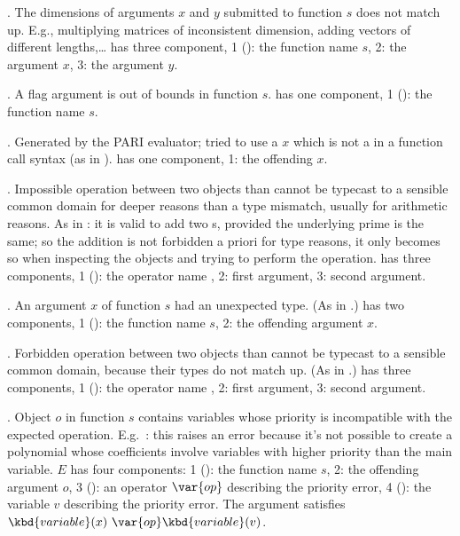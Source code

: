 
 \item {}. The dimensions of arguments $x$ and $y$ submitted
 to function $s$ does not match up.
 E.g., multiplying matrices of inconsistent dimension, adding vectors of
 different lengths,\dots
  has three component, 1 (): the function name $s$, 2: the
 argument $x$, 3: the argument $y$.

 \item {}. A flag argument is out of bounds in function $s$.
  has one component, 1 (): the function name $s$.

 \item {}. Generated by the PARI evaluator; tried to use a
 $x$ which is not a  in a function call syntax (as in
).
  has one component, 1: the offending  $x$.

 \item {}. Impossible operation between two objects than cannot
 be typecast to a sensible common domain for deeper reasons than a type
 mismatch, usually for arithmetic reasons. As in : it is
 valid to add two s, provided the underlying prime is the same; so
 the addition is not forbidden a priori for type reasons, it only becomes so
 when inspecting the objects and trying to perform the operation.
  has three components, 1 (): the operator name ,
 2: first argument, 3: second argument.

 \item {}. An argument $x$ of function $s$ had an unexpected type.
 (As in .)
  has two components, 1 (): the function name $s$,
 2: the offending argument $x$.

 \item {}. Forbidden operation between two objects than cannot be
 typecast to a sensible common domain, because their types do not match up.
 (As in .)
  has three components, 1 (): the operator name ,
 2: first argument, 3: second argument.

 \item {}. Object $o$ in function $s$ contains
 variables whose priority is incompatible with the expected operation.
 E.g.~: this raises an error because it's not possible to
 create a polynomial whose coefficients involve variables with higher priority
 than the main variable. $E$ has four components: 1 (): the function
 name $s$, 2: the offending argument $o$, 3 (): an operator
 $\var{op}$ describing the priority error, 4 ():
 the variable $v$ describing the priority error. The argument
 satisfies $\kbd{variable}(x)~\var{op} \kbd{variable}(v)$.

